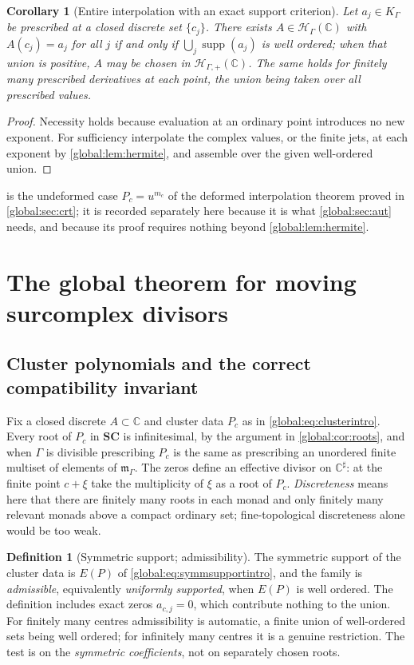 \documentclass[11pt,letterpaper]{article}
\newtheorem{corollary}[corollary]{Corollary}
\theoremstyle{definition}
\newtheorem{definition}[definition]{Definition}
\theoremstyle{remark}
\newcommand{\SC}{\mathbf{SC}}
\newcommand{\C}{\mathbb C}
\newcommand{\HH}{\mathscr H_\Gamma}
\newcommand{\HP}{\mathscr H_{\Gamma,+}}
\newcommand{\KK}{K_\Gamma}
\newcommand{\mK}{\mathfrak m_\Gamma}
\newcommand{\sh}{^{\sharp}}
\newcommand{\supp}{\operatorname{supp}}
\numberwithin{equation}{section}
\begin{document}
\begin{corollary}[Entire interpolation with an exact support criterion]\label{global:cor:interp}
Let $a_j\in\KK$ be prescribed at a closed discrete set $\{c_j\}$. There exists $A\in\HH(\C)$ with $A(c_j)=a_j$ for all $j$ if and only if $\bigcup_j\supp(a_j)$ is well ordered; when that union is positive, $A$ may be chosen in $\HP(\C)$. The same holds for finitely many prescribed derivatives at each point, the union being taken over all prescribed values.
\end{corollary}

\begin{proof}
Necessity holds because evaluation at an ordinary point introduces no new exponent. For sufficiency interpolate the complex values, or the finite jets, at each exponent by \cref{global:lem:hermite}, and assemble over the given well-ordered union.
\end{proof}

 is the undeformed case $P_c=u^{m_c}$ of the deformed interpolation theorem proved in \cref{global:sec:crt}; it is recorded separately here because it is what \cref{global:sec:aut} needs, and because its proof requires nothing beyond \cref{global:lem:hermite}.

\section{The global theorem for moving surcomplex divisors}\label{global:sec:divisor}

\subsection{Cluster polynomials and the correct compatibility invariant}

Fix a closed discrete $A\subset\C$ and cluster data $P_c$ as in \eqref{global:eq:clusterintro}. Every root of $P_c$ in $\SC$ is infinitesimal, by the argument in \cref{global:cor:roots}, and when $\Gamma$ is divisible prescribing $P_c$ is the same as prescribing an unordered finite multiset of elements of $\mK$. The zeros define an effective divisor on $\C\sh$: at the finite point $c+\xi$ take the multiplicity of $\xi$ as a root of $P_c$. \emph{Discreteness} means here that there are finitely many roots in each monad and only finitely many relevant monads above a compact ordinary set; fine-topological discreteness alone would be too weak.

\begin{definition}[Symmetric support; admissibility]\label{global:def:admissible}
The symmetric support of the cluster data is $E(P)$ of \eqref{global:eq:symmsupportintro}, and the family is \emph{admissible}, equivalently \emph{uniformly supported}, when $E(P)$ is well ordered. The definition includes exact zeros $a_{c,j}=0$, which contribute nothing to the union. For finitely many centres admissibility is automatic, a finite union of well-ordered sets being well ordered; for infinitely many centres it is a genuine restriction. The test is on the \emph{symmetric coefficients}, not on separately chosen roots.
\end{definition}
\end{document}
